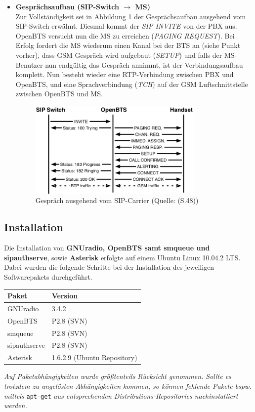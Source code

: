 \begin{itemize}
\item \textbf{Gesprächsaufbau (SIP-Switch $\rightarrow$ MS)}\\
Zur Vollständigkeit sei in Abbildung \ref{fig:openbts_call_carrierside} der Gesprächsaufbau ausgehend vom SIP-Switch erwähnt. Diesmal kommt der \textit{SIP INVITE} von der PBX aus. OpenBTS versucht nun die MS zu erreichen (\textit{PAGING REQUEST}). Bei Erfolg fordert die MS wiederum einen Kanal bei der BTS an (siehe Punkt vorher), dass GSM Gespräch wird aufgebaut (\textit{SETUP}) und falls der MS-Benutzer nun endgültig das Gespräch annimmt, ist der Verbindungsaufbau komplett. Nun besteht wieder eine RTP-Verbindung zwischen PBX und OpenBTS, und eine Sprachverbindung (\textit{TCH}) auf der GSM Luftschnittstelle zwischen OpenBTS und MS. 
\begin{figure}[h]
	\centering
		\includegraphics[width=0.80\textwidth]{img/openbts_call_carrierside.png}
	\caption{Gespräch ausgehend vom SIP-Carrier (Quelle: \cite{bib:openbtsmanual}(S.48))}
	\label{fig:openbts_call_carrierside}
\end{figure}
\end{itemize}

\subsection{Installation}
\label{sec:Installation}
Die Installation von \textbf{GNUradio, OpenBTS samt smqueue und sipauthserve}, sowie \textbf{Asterisk} erfolgte auf einem Ubuntu Linux 10.04.2 LTS. Dabei wurden die folgende Schritte bei der Installation des jeweiligen Softwarepakets durchgeführt.\\

\begin{center}
\begin{tabular}{l|l}
\textbf{Paket} & \textbf{Version}\\
\hline 
GNUradio & 3.4.2\\
OpenBTS & P2.8 (SVN)\\
smqueue & P2.8 (SVN)\\
sipauthserve & P2.8 (SVN)\\
Asterisk & 1.6.2.9 (Ubuntu Repository)\\
\end{tabular}
\end{center}
\textit{Auf Paketabhängigkeiten wurde größtenteils Rücksicht genommen. Sollte es trotzdem zu ungelösten Abhängigkeiten kommen, so können fehlende Pakete bspw. mittels} \verb|apt-get| \textit{aus entsprechenden Distributions-Repositories nachinstalliert werden.}


